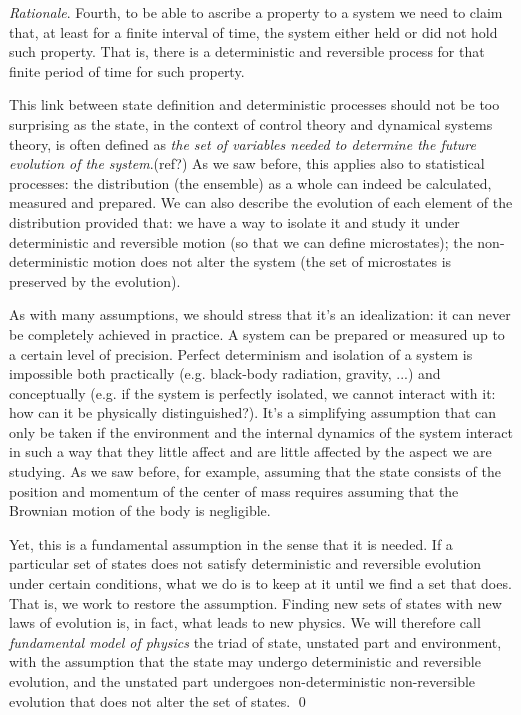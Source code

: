 \documentclass[aps,pra,10pt,twocolumn,floatfix,nofootinbib]{revtex4-1}
\numberwithin{equation}{section}
\theoremstyle{definition}
\newenvironment{rationale}{\emph{Rationale}.}{\qed}
\begin{document}
\begin{rationale}
Fourth, to be able to ascribe a property to a system we need to claim that, at least for a finite interval of time, the system either held or did not hold such property. That is, there is a deterministic and reversible process for that finite period of time for such property.

This link between state definition and deterministic processes should not be too surprising as the state, in the context of control theory and dynamical systems theory, is often defined as \emph{the set of variables needed to determine the future evolution of the system}.(ref?) As we saw before, this applies also to statistical processes: the distribution (the ensemble) as a whole can indeed be calculated, measured and prepared. We can also describe the evolution of each element of the distribution provided that: we have a way to isolate it and study it under deterministic and reversible motion (so that we can define microstates); the non-deterministic motion does not alter the system (the set of microstates is preserved by the evolution).

As with many assumptions, we should stress that it's an idealization: it can never be completely achieved in practice. A system can be prepared or measured up to a certain level of precision. Perfect determinism and isolation of a system is impossible both practically (e.g. black-body radiation, gravity, ...) and conceptually (e.g. if the system is perfectly isolated, we cannot interact with it: how can it be physically distinguished?). It's a simplifying assumption that can only be taken if the environment and the internal dynamics of the system interact in such a way that they little affect and are little affected by the aspect we are studying. As we saw before, for example, assuming that the state consists of the position and momentum of the center of mass requires assuming that the Brownian motion of the body is negligible.

Yet, this is a fundamental assumption in the sense that it is needed. If a particular set of states does not satisfy deterministic and reversible evolution under certain conditions, what we do is to keep at it until we find a set that does. That is, we work to restore the assumption. Finding new sets of states with new laws of evolution is, in fact, what leads to new physics. We will therefore call \emph{fundamental model of physics} the triad of state, unstated part and environment, with the assumption that the state may undergo deterministic and reversible evolution, and the unstated part undergoes non-deterministic non-reversible evolution that does not alter the set of states.
\end{rationale}
\end{document}

